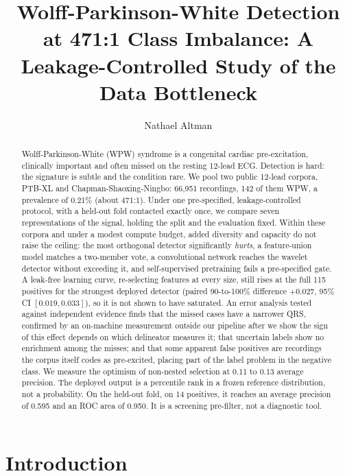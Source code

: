 \documentclass[11pt]{article}
\title{\vspace{-2em}\bfseries Wolff-Parkinson-White Detection at 471:1 Class Imbalance: A Leakage-Controlled Study of the Data Bottleneck}
\author[]{Nathael Altman}
\affil[]{Coll\`ege Jean-de-Br\'ebeuf, Montr\'eal, Canada}
\date{}
\begin{document}
\maketitle

\begin{abstract}
\noindent
Wolff-Parkinson-White (WPW) syndrome is a congenital cardiac pre-excitation, clinically important and often missed on the resting 12-lead ECG. Detection is hard: the signature is subtle and the condition rare. We pool two public 12-lead corpora, PTB-XL and Chapman-Shaoxing-Ningbo: 66{,}951 recordings, 142 of them WPW, a prevalence of 0.21\% (about 471:1). Under one pre-specified, leakage-controlled protocol, with a held-out fold contacted exactly once, we compare seven representations of the signal, holding the split and the evaluation fixed. Within these corpora and under a modest compute budget, added diversity and capacity do not raise the ceiling: the most orthogonal detector significantly \emph{hurts}, a feature-union model matches a two-member vote, a convolutional network reaches the wavelet detector without exceeding it, and self-supervised pretraining fails a pre-specified gate. A leak-free learning curve, re-selecting features at every size, still rises at the full 115 positives for the strongest deployed detector (paired 90-to-100\% difference $+0.027$, 95\% CI $[0.019, 0.033]$), so it is not shown to have saturated. An error analysis tested against independent evidence finds that the missed cases have a narrower QRS, confirmed by an on-machine measurement outside our pipeline after we show the sign of this effect depends on which delineator measures it; that uncertain labels show no enrichment among the misses; and that some apparent false positives are recordings the corpus itself codes as pre-excited, placing part of the label problem in the negative class. We measure the optimism of non-nested selection at 0.11 to 0.13 average precision. The deployed output is a percentile rank in a frozen reference distribution, not a probability. On the held-out fold, on 14 positives, it reaches an average precision of 0.595 and an ROC area of 0.950. It is a screening pre-filter, not a diagnostic tool.
\end{abstract}

\vspace{1em}

\section{Introduction}
\end{document}

